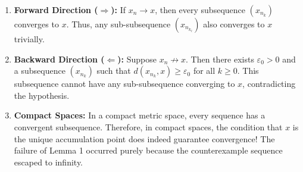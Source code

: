 \begin{content}


\begin{steps}
\begin{enumerate}[label=\textbf{(\arabic*)}]
    \item \textbf{Forward Direction ($\Longrightarrow$):} If $x_n \to x$, then every subsequence $(x_{n_k})$ converges to $x$. Thus, any sub-subsequence $(x_{n_{k_\ell}})$ also converges to $x$ trivially.
    \item \textbf{Backward Direction ($\Longleftarrow$):} Suppose $x_n \not\to x$. Then there exists $\varepsilon_0 > 0$ and a subsequence $(x_{n_k})$ such that $d(x_{n_k}, x) \ge \varepsilon_0$ for all $k \ge 0$. This subsequence cannot have any sub-subsequence converging to $x$, contradicting the hypothesis.
    \item \textbf{Compact Spaces:} In a compact metric space, every sequence has a convergent subsequence. Therefore, in compact spaces, the condition that $x$ is the unique accumulation point does indeed guarantee convergence! The failure of Lemma 1 occurred purely because the counterexample sequence escaped to infinity.
\end{enumerate}
\end{steps}
\end{content}

\begin{hidden}
\end{hidden}

